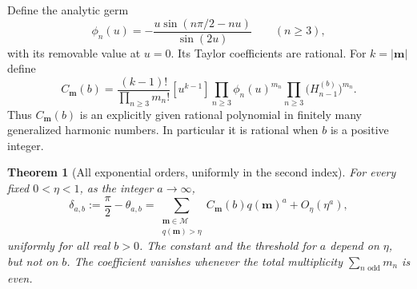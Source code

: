 \documentclass[11pt,a4paper]{article}
\newtheorem{theorem}{Theorem}[section]
\theoremstyle{definition}
\theoremstyle{remark}
\numberwithin{equation}{section}
\begin{document}
Define the analytic germ
\begin{equation}\label{angular:eq:phi}
 \phi_n(u)=-\frac{u\sin(n\pi/2-nu)}{\sin(2u)}\qquad(n\geq3),
\end{equation}
with its removable value at $u=0$. Its Taylor coefficients are rational.
For $k=|\mathbf m|$ define
\begin{equation}\label{angular:eq:coefficient}
 C_{\mathbf m}(b)=
 \frac{(k-1)!}{\prod_{n\geq3}m_n!}
 [u^{k-1}]\prod_{n\geq3}\phi_n(u)^{m_n}
 \prod_{n\geq3}\bigl(H_{n-1}^{(b)}\bigr)^{m_n}.
\end{equation}
Thus $C_{\mathbf m}(b)$ is an explicitly given rational polynomial
in finitely many generalized harmonic numbers. In particular it is
rational when $b$ is a positive integer.

\begin{theorem}[All exponential orders, uniformly in the second index]
\label{angular:thm:allorders}
For every fixed $0<\eta<1$, as the integer $a\to\infty$,
\begin{equation}\label{angular:eq:allorders}
 \delta_{a,b}:=\frac\pi2-\theta_{a,b}
 =\sum_{\substack{\mathbf m\in\mathscr M\\q(\mathbf m)>\eta}}
 C_{\mathbf m}(b)q(\mathbf m)^a+O_\eta(\eta^a),
\end{equation}
uniformly for all real $b>0$. The constant and the threshold for $a$
depend on $\eta$, but not on $b$. The coefficient vanishes whenever
the total multiplicity $\sum_{n\text{ odd}}m_n$ is even.
\end{theorem}
\end{document}
